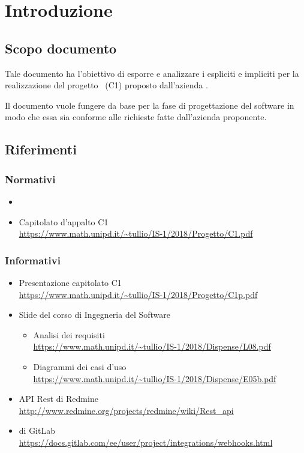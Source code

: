 \newpage
\section{Introduzione}

	\subsection{Scopo documento}
	Tale documento ha l'obiettivo di esporre e analizzare i  espliciti e impliciti per la realizzazione del progetto \progetto\ (C1) proposto dall'azienda \II.

	Il documento vuole fungere da base per la fase di progettazione del software in modo che essa sia conforme alle richieste fatte dall'azienda proponente.

    

    

	\subsection{Riferimenti}

	\subsubsection{Normativi}
	\begin{itemize}
		\item \Doc{\NdPv}
		\item Capitolato d'appalto C1\\
		\url{https://www.math.unipd.it/~tullio/IS-1/2018/Progetto/C1.pdf}
	\end{itemize}

	\subsubsection{Informativi} \label{sec:RiferimentiInformativi}
	\begin{itemize}
		\item Presentazione capitolato C1\\
		\url{https://www.math.unipd.it/~tullio/IS-1/2018/Progetto/C1p.pdf}
		\item Slide del corso di Ingegneria del Software
		\begin{itemize}
			\item Analisi dei requisiti\\
			\url{https://www.math.unipd.it/~tullio/IS-1/2018/Dispense/L08.pdf}
			\item Diagrammi dei casi d'uso\\
			\url{https://www.math.unipd.it/~tullio/IS-1/2018/Dispense/E05b.pdf}
		\end{itemize}
		\item API Rest di Redmine\\
		\url{http://www.redmine.org/projects/redmine/wiki/Rest_api}
		\item {} di GitLab\\
		\url{https://docs.gitlab.com/ee/user/project/integrations/webhooks.html}
	\end{itemize}